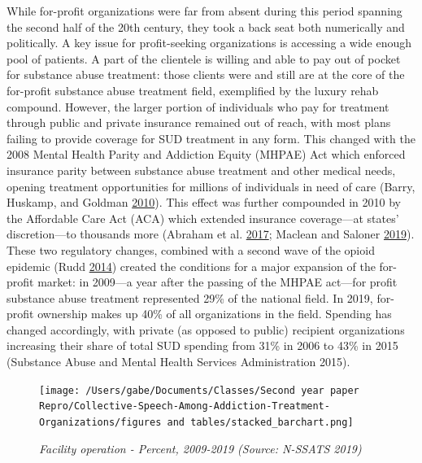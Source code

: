 \documentclass[
  12pt,
]{article}
\begin{document}
\vspace{12pt}

While for-profit organizations were far from absent during this period spanning the second half of the 20th century, they took a back seat both numerically and politically. A key issue for profit-seeking organizations is accessing a wide enough pool of patients. A part of the clientele is willing and able to pay out of pocket for substance abuse treatment: those clients were and still are at the core of the for-profit substance abuse treatment field, exemplified by the luxury rehab compound. However, the larger portion of individuals who pay for treatment through public and private insurance remained out of reach, with most plans failing to provide coverage for SUD treatment in any form. This changed with the 2008 Mental Health Parity and Addiction Equity (MHPAE) Act which enforced insurance parity between substance abuse treatment and other medical needs, opening treatment opportunities for millions of individuals in need of care (Barry, Huskamp, and Goldman \protect\hyperlink{ref-barry2010}{2010}). This effect was further compounded in 2010 by the Affordable Care Act (ACA) which extended insurance coverage---at states' discretion---to thousands more (Abraham et al. \protect\hyperlink{ref-abraham2017}{2017}; Maclean and Saloner \protect\hyperlink{ref-maclean2019}{2019}). These two regulatory changes, combined with a second wave of the opioid epidemic (Rudd \protect\hyperlink{ref-rudd2014}{2014}) created the conditions for a major expansion of the for-profit market: in 2009---a year after the passing of the MHPAE act---for profit substance abuse treatment represented 29\% of the national field. In 2019, for-profit ownership makes up 40\% of all organizations in the field. Spending has changed accordingly, with private (as opposed to public) recipient organizations increasing their share of total SUD spending from 31\% in 2006 to 43\% in 2015 (Substance Abuse and Mental Health Services Administration 2015).

\begin{figure}
\centering
\texttt{[image: /Users/gabe/Documents/Classes/Second year paper Repro/Collective-Speech-Among-Addiction-Treatment-Organizations/figures and tables/stacked\_barchart.png]}
\caption{\label{fig:unnamed-chunk-2}\textit{Facility operation - Percent, 2009-2019 (Source: N-SSATS 2019)}}
\end{figure}
\end{document}
